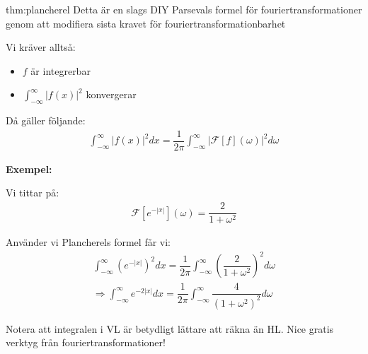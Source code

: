 \begin{theo}{thm:plancherel}
  Detta är en slags DIY Parsevals formel för fouriertransformationer genom att modifiera sista kravet för fouriertransformationbarhet\par
  \noindent Vi kräver alltså:\par
  \begin{itemize}
    \item $f$ är integrerbar
    \item $\int_{-\infty}^{\infty}\left|f(x)\right|^2$ konvergerar
  \end{itemize}
  \par\bigskip
  \noindent Då gäller följande: 
  \begin{equation*}
    \begin{gathered}
      \int_{-\infty}^{\infty}\left|f(x)\right|^2dx = \dfrac{1}{2\pi}\int_{-\infty}^{\infty}\left|\mathcal{F}\left[f\right](\omega)\right|^2d\omega
    \end{gathered}
  \end{equation*}\par
\end{theo}
\par\bigskip
\noindent\textbf{Exempel:}\par
\noindent Vi tittar på:
\begin{equation*}
  \begin{gathered}
    \mathcal{F}\left[e^{-\left|x\right|}\right](\omega) = \dfrac{2}{1+\omega^2}
  \end{gathered}
\end{equation*}
\par\bigskip
\noindent Använder vi Plancherels formel får vi:
\begin{equation*}
  \begin{gathered}
    \int_{-\infty}^{\infty}\left(e^{-\left|x\right|}\right)^2dx = \dfrac{1}{2\pi}\int_{-\infty}^{\infty}\left(\dfrac{2}{1+\omega^2}\right)^2d\omega\\
    \Rightarrow\int_{-\infty}^{\infty}e^{-2\left|x\right|}dx = \dfrac{1}{2\pi}\int_{-\infty}^{\infty}\dfrac{4}{(1+\omega^2)^2}d\omega
  \end{gathered}
\end{equation*}
\par\bigskip
\noindent Notera att integralen i VL är betydligt lättare att räkna än HL. Nice gratis verktyg från fouriertransformationer! 
